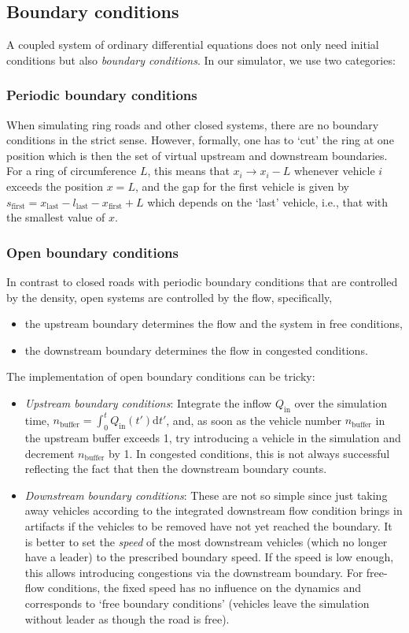 \documentclass[paper=A4,pagesize=auto,11pt]{scrartcl}
\providecommand{\gquote}[1]{`#1'}
\newcommand{\sub}[1]{_\text{#1}}
\providecommand{\bi}{\begin{itemize}}
\providecommand{\ei}{\end{itemize}}
\begin{document}
\subsection{Boundary conditions}
A coupled system of ordinary differential equations does not only need
initial conditions but also \emph{boundary conditions}. In our
simulator, we use two categories:

\subsubsection{Periodic boundary conditions}
When simulating ring roads and other closed systems, there are no
boundary conditions in the strict sense. However, formally, one has to
\gquote{cut} the ring at one position which is then the set of virtual
upstream and downstream boundaries. For a ring 
of circumference $L$, this means that $x_i \to x_i-L$ whenever vehicle $i$ exceeds the
position $x=L$, and the gap for the first vehicle is given by
$s\sub{first}=x\sub{last}-l\sub{last}-x\sub{first}+L$ which depends on
the \gquote{last} vehicle, i.e., that with
the smallest value of $x$. 

\subsubsection{Open boundary conditions}
In contrast to closed roads with periodic boundary conditions that are
controlled by the density, open systems are controlled by the flow,
specifically, 
\bi
\item the upstream boundary determines the flow and the system in free
  conditions, 
\item the downstream boundary determines the flow in congested
  conditions.
\ei
The implementation of open boundary conditions can be tricky:
\bi
\item \emph{Upstream boundary conditions}: Integrate the inflow $Q\sub{in}$
  over the simulation time, $n\sub{buffer}=\int^t_0 Q\sub{in}(t') \text{d}t'$,
  and, as soon as the vehicle number $n\sub{buffer}$ in the upstream
  buffer exceeds 1, try introducing a vehicle in the simulation and
  decrement $n\sub{buffer}$ by 1. In congested conditions, this is not
  always successful reflecting the fact that then the downstream
  boundary counts.
\item \emph{Downstream boundary conditions}: These are not so simple
  since just taking away vehicles according to the integrated
  downstream flow condition brings in artifacts if the
  vehicles to be removed have not yet reached the boundary. It is
  better to set the \emph{speed} of the most downstream vehicles
  (which no longer have a leader) to
  the prescribed boundary speed. If the speed is low enough, this
  allows introducing congestions via the downstream boundary. For
  free-flow conditions, the fixed speed has no influence on the
  dynamics and corresponds to \gquote{free boundary conditions} (vehicles
  leave the simulation without leader as though the road is free).
\ei
\end{document}
